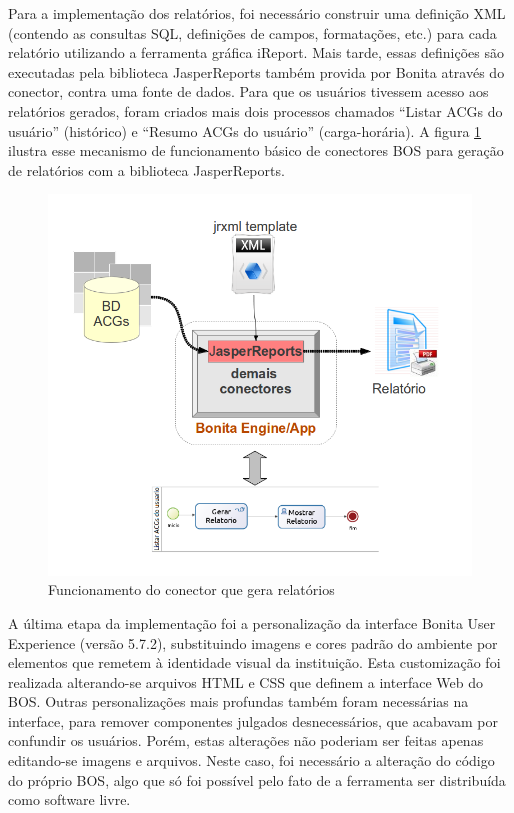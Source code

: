 \documentclass[12pt]{article}
\begin{document}

Para a implementação dos relatórios, foi necessário construir uma definição XML (contendo as consultas SQL, definições de campos, formatações, etc.)  para cada relatório utilizando a ferramenta gráfica iReport. Mais tarde, essas definições são executadas pela biblioteca JasperReports também provida por Bonita através do conector, contra uma fonte de dados. Para que os usuários tivessem acesso aos relatórios gerados, foram criados mais dois processos chamados “Listar ACGs do usuário” (histórico) e “Resumo ACGs do usuário” (carga-horária). A figura \ref{fig:reports} ilustra esse mecanismo de funcionamento básico de conectores BOS para geração de relatórios com a biblioteca JasperReports.

\begin{figure}[ht]
\centering
\includegraphics[width=.5\textwidth]{images/conector.png}
\caption{Funcionamento do conector que gera relatórios}
\label{fig:reports}
\end{figure}


A última etapa da implementação foi a personalização da interface Bonita User Experience (versão 5.7.2), substituindo imagens e cores padrão do ambiente por elementos que remetem à identidade visual da instituição. Esta customização foi realizada alterando-se arquivos HTML e CSS que definem a interface Web do BOS. Outras personalizações mais profundas também foram necessárias na interface, para remover componentes julgados desnecessários, que acabavam por confundir os usuários. Porém, estas alterações não poderiam ser feitas apenas editando-se imagens e arquivos. Neste caso, foi necessário a alteração do código do próprio BOS, algo que só foi possível pelo fato de a ferramenta ser distribuída como software livre.
\end{document}

